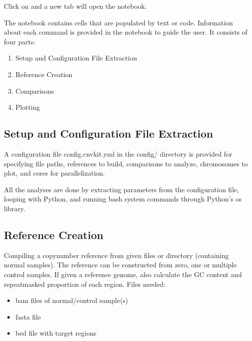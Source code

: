 \documentclass[letterpaper,10pt,english]{sphinxhowto}
\begin{document}
\sphinxAtStartPar
Click on  and a new tab will open the notebook.

\sphinxAtStartPar
The notebook contains cells that are populated by text or code. Information about each command is provided in the notebook to guide the user. It consists of four parts:
\begin{enumerate}
%
\item {} 
\sphinxAtStartPar
Setup and Configuration File Extraction

\item {} 
\sphinxAtStartPar
Reference Creation

\item {} 
\sphinxAtStartPar
Comparisons

\item {} 
\sphinxAtStartPar
Plotting

\end{enumerate}


\subsection{Setup and Configuration File Extraction}
\label{\detokenize{index:setup-and-configuration-file-extraction}}
\sphinxAtStartPar
A configuration file config.cnvkit.yml in the config/ directory is provided for specifying file paths, references to build, comparisons to analyze, chromosomes to plot, and cores for parallelization.

\sphinxAtStartPar
All the analyses are done by extracting parameters from the configuration file, looping with Python, and running bash system commands through Python’s os library.


\subsection{Reference Creation}
\label{\detokenize{index:reference-creation}}
\sphinxAtStartPar
Compiling a copy\sphinxhyphen{}number reference from given files or directory (containing normal samples). The reference can be constructed from zero, one or multiple control samples. If given a reference genome, also calculate the GC content and repeat\sphinxhyphen{}masked proportion of each region. Files needed:
\begin{itemize}
\item {} 
\sphinxAtStartPar
bam files of normal/control sample(s)

\item {} 
\sphinxAtStartPar
fasta file

\item {} 
\sphinxAtStartPar
bed file with target regions

\end{itemize}
\end{document}
